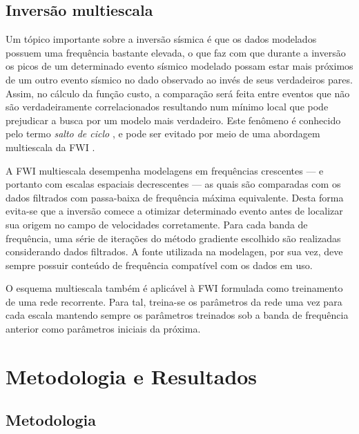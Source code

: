   \section{Inversão multiescala}

    Um tópico importante sobre a inversão sísmica é que os dados modelados possuem uma frequência bastante elevada, o que faz com que durante a inversão os picos de um determinado evento sísmico modelado possam estar mais próximos de um outro evento sísmico no dado observado ao invés de seus verdadeiros pares. Assim, no cálculo da função custo, a comparação será feita entre eventos que não são verdadeiramente correlacionados resultando num mínimo local que pode prejudicar a busca por um modelo mais verdadeiro. Este fenômeno é conhecido pelo termo \emph{salto de ciclo} , e pode ser evitado por meio de uma abordagem multiescala da FWI .

    A FWI multiescala desempenha modelagens em frequências crescentes --- e portanto com escalas espaciais decrescentes --- as quais são comparadas com os dados filtrados com passa-baixa de frequência máxima equivalente. Desta forma evita-se que a inversão comece a otimizar determinado evento antes de localizar sua origem no campo de velocidades corretamente. Para cada banda de frequência, uma série de iterações do método gradiente escolhido são realizadas considerando dados filtrados. A fonte utilizada na modelagen, por sua vez, deve sempre possuir conteúdo de frequência compatível com os dados em uso.

    O esquema multiescala também é aplicável à FWI formulada como treinamento de uma rede recorrente. Para tal, treina-se os parâmetros da rede uma vez para cada escala mantendo sempre os parâmetros treinados sob a banda de frequência anterior como parâmetros iniciais da próxima.

\chapter{Metodologia e Resultados}

  \section{Metodologia}

